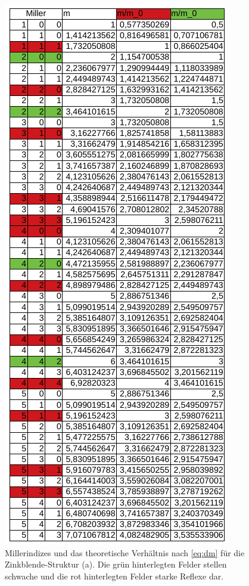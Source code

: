 \begin{figure}
  \centering
  \includegraphics{ressources/Zinkblende.png}
  \caption{Millerindizes und das theoretische Verhältnis nach \ref{eq:dm} für die Zinkblende-Struktur (a). Die grün hinterlegten Felder stellen schwache und die rot hinterlegten Felder starke Reflexe dar.}
  \label{fig:Anhang5}
\end{figure}


